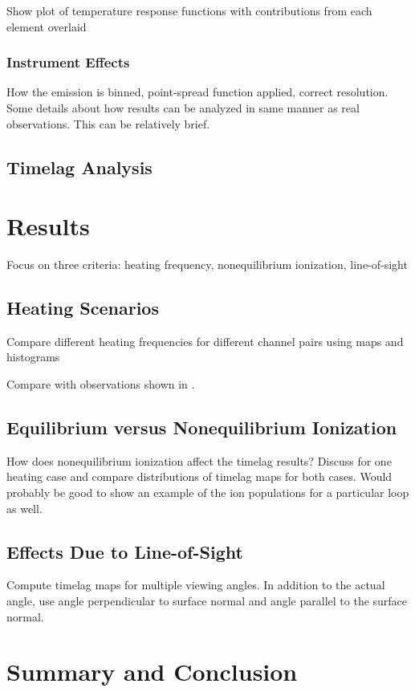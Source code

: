 \documentclass[modern,linenumbers]{aastex62}
\begin{document}
Show plot of temperature response functions with contributions from each element overlaid

\subsubsection{Instrument Effects}
\label{instrument}
How the emission is binned, point-spread function applied, correct resolution. Some details about how results can be analyzed in same manner as real observations. This can be relatively brief.

\subsection{Timelag Analysis}
\label{timelag_analysis}


\section{Results}
\label{results}
Focus on three criteria: heating frequency, nonequilibrium ionization, line-of-sight

\subsection{Heating Scenarios}
Compare different heating frequencies for different channel pairs using maps and histograms

Compare with observations shown in \citet{viall_survey_2017}.

\subsection{Equilibrium versus Nonequilibrium Ionization}
How does nonequilibrium ionization affect the timelag results? Discuss for one heating case and compare distributions of timelag maps for both cases. Would probably be good to show an example of the ion populations for a particular loop as well.

\subsection{Effects Due to Line-of-Sight}
Compute timelag maps for multiple viewing angles. In addition to the actual angle, use angle perpendicular to surface normal and angle parallel to the surface normal.

\section{Summary and Conclusion}
\label{conclusions}

\acknowledgments





\end{document}
